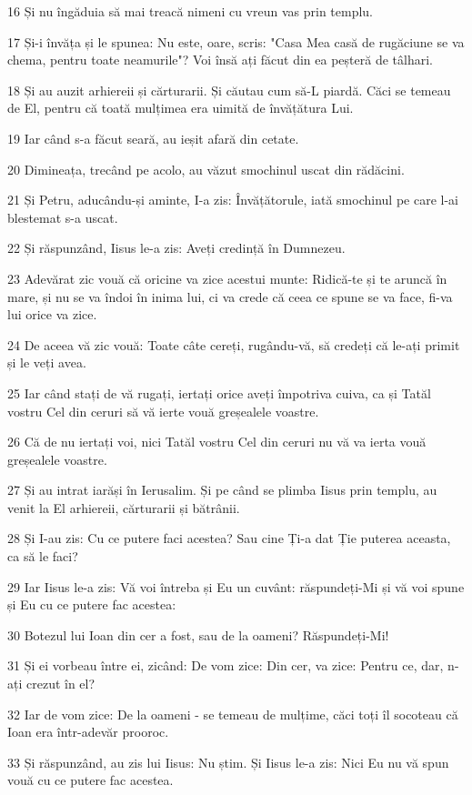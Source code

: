 \par 16 Și nu îngăduia să mai treacă nimeni cu vreun vas prin templu.
\par 17 Și-i învăța și le spunea: Nu este, oare, scris: "Casa Mea casă de rugăciune se va chema, pentru toate neamurile"? Voi însă ați făcut din ea peșteră de tâlhari.
\par 18 Și au auzit arhiereii și cărturarii. Și căutau cum să-L piardă. Căci se temeau de El, pentru că toată mulțimea era uimită de învățătura Lui.
\par 19 Iar când s-a făcut seară, au ieșit afară din cetate.
\par 20 Dimineața, trecând pe acolo, au văzut smochinul uscat din rădăcini.
\par 21 Și Petru, aducându-și aminte, I-a zis: Învățătorule, iată smochinul pe care l-ai blestemat s-a uscat.
\par 22 Și răspunzând, Iisus le-a zis: Aveți credință în Dumnezeu.
\par 23 Adevărat zic vouă că oricine va zice acestui munte: Ridică-te și te aruncă în mare, și nu se va îndoi în inima lui, ci va crede că ceea ce spune se va face, fi-va lui orice va zice.
\par 24 De aceea vă zic vouă: Toate câte cereți, rugându-vă, să credeți că le-ați primit și le veți avea.
\par 25 Iar când stați de vă rugați, iertați orice aveți împotriva cuiva, ca și Tatăl vostru Cel din ceruri să vă ierte vouă greșealele voastre.
\par 26 Că de nu iertați voi, nici Tatăl vostru Cel din ceruri nu vă va ierta vouă greșealele voastre.
\par 27 Și au intrat iarăși în Ierusalim. Și pe când se plimba Iisus prin templu, au venit la El arhiereii, cărturarii și bătrânii.
\par 28 Și I-au zis: Cu ce putere faci acestea? Sau cine Ți-a dat Ție puterea aceasta, ca să le faci?
\par 29 Iar Iisus le-a zis: Vă voi întreba și Eu un cuvânt: răspundeți-Mi și vă voi spune și Eu cu ce putere fac acestea:
\par 30 Botezul lui Ioan din cer a fost, sau de la oameni? Răspundeți-Mi!
\par 31 Și ei vorbeau între ei, zicând: De vom zice: Din cer, va zice: Pentru ce, dar, n-ați crezut în el?
\par 32 Iar de vom zice: De la oameni - se temeau de mulțime, căci toți îl socoteau că Ioan era într-adevăr prooroc.
\par 33 Și răspunzând, au zis lui Iisus: Nu știm. Și Iisus le-a zis: Nici Eu nu vă spun vouă cu ce putere fac acestea.


